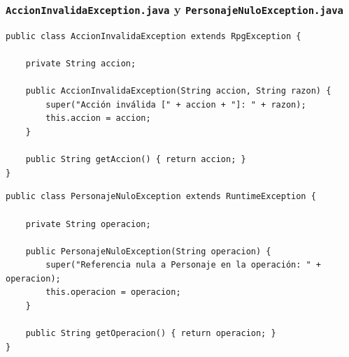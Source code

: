 \documentclass[11pt,letterpaper]{article}
\begin{document}
\subsubsection{\texttt{AccionInvalidaException.java} y \texttt{PersonajeNuloException.java}}
\begin{lstlisting}[style=JavaStyle]
public class AccionInvalidaException extends RpgException {

    private String accion;

    public AccionInvalidaException(String accion, String razon) {
        super("Acción inválida [" + accion + "]: " + razon);
        this.accion = accion;
    }

    public String getAccion() { return accion; }
}
\end{lstlisting}

\begin{lstlisting}[style=JavaStyle]
public class PersonajeNuloException extends RuntimeException {

    private String operacion;

    public PersonajeNuloException(String operacion) {
        super("Referencia nula a Personaje en la operación: " + operacion);
        this.operacion = operacion;
    }

    public String getOperacion() { return operacion; }
}
\end{lstlisting}
\end{document}
